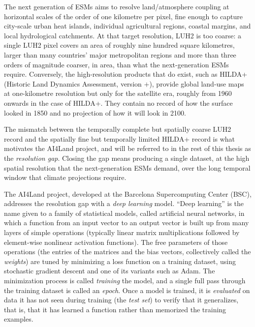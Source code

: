 \documentclass[12pt,a4paper]{article}
\begin{document}
The next generation of ESMs aims to resolve land/atmosphere coupling at horizontal scales of
the order of one kilometre per pixel, fine enough to capture city-scale urban heat islands,
individual agricultural regions, coastal margins, and local hydrological catchments. At that
target resolution, LUH2 is too coarse: a single LUH2 pixel covers an area of roughly nine
hundred square kilometres, larger than many countries' major metropolitan regions and more
than three orders of magnitude coarser, in area, than what the next-generation ESMs require.
Conversely, the high-resolution products that do exist, such as HILDA+~\cite{winkler2020hilda}
(Historic Land Dynamics Assessment, version $+$), provide global land-use maps at
one-kilometre resolution but only for the satellite era, roughly from 1960 onwards in the case
of HILDA+. They contain no record of how the surface looked in 1850 and no projection of how
it will look in 2100.

The mismatch between the temporally complete but spatially coarse LUH2 record and the
spatially fine but temporally limited HILDA+ record is what motivates the AI4Land project, and
will be referred to in the rest of this thesis as the \emph{resolution gap}. Closing the gap
means producing a single dataset, at the high spatial resolution that the next-generation ESMs
demand, over the long temporal window that climate projections require.

The AI4Land project, developed at the Barcelona Supercomputing Center (BSC), addresses the
resolution gap with a \emph{deep learning} model. ``Deep learning'' is the name given to a
family of statistical models, called artificial neural networks, in which a function from an
input vector to an output vector is built up from many layers of simple operations
(typically linear matrix multiplications followed by element-wise nonlinear activation
functions). The free parameters of those operations (the entries of the matrices and the
bias vectors, collectively called the \emph{weights}) are tuned by minimizing a loss function
on a training dataset, using stochastic gradient descent and one of its variants such as
Adam. The minimization process is called \emph{training} the model, and a single full pass
through the training dataset is called an \emph{epoch}. Once a model is trained, it is
\emph{evaluated} on data it has not seen during training (the \emph{test set}) to verify that
it generalizes, that is, that it has learned a function rather than memorized the training
examples.
\end{document}

